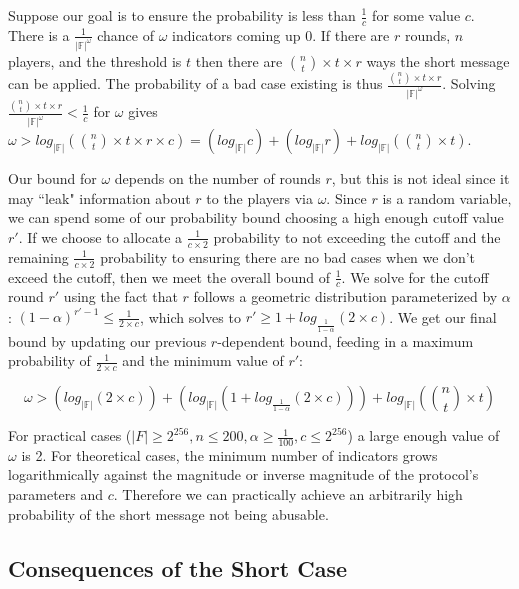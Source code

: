 \documentclass{dalcsthesis}
\begin{document}
Suppose our goal is to ensure the probability is less than $\frac{1}{c}$ for some value $c$. There is a $\frac{1}{|\mathbb{F}|^\omega}$ chance of $\omega$ indicators coming up 0. If there are $r$ rounds, $n$ players, and the threshold is $t$ then there are ${n \choose t} \times t \times r$ ways the short message can be applied. The probability of a bad case existing is thus $\frac{{n \choose t} \times t \times r}{|\mathbb{F}|^\omega}$. Solving $\frac{{n \choose t} \times t \times r}{|\mathbb{F}|^\omega} < \frac{1}{c}$ for $\omega$ gives $\omega > log_{|\mathbb{F}|} ({n \choose t} \times t \times r \times c) = (log_{|\mathbb{F}|} c) + (log_{|\mathbb{F}|} r) + log_{|\mathbb{F}|} ({n \choose t} \times t)$.

Our bound for $\omega$ depends on the number of rounds $r$, but this is not ideal since it may ``leak" information about $r$ to the players via $\omega$. Since $r$ is a random variable, we can spend some of our probability bound choosing a high enough cutoff value $r'$. If we choose to allocate a $\frac{1}{c \times 2}$ probability to not exceeding the cutoff and the remaining $\frac{1}{c \times 2}$ probability to ensuring there are no bad cases when we don't exceed the cutoff, then we meet the overall bound of $\frac{1}{c}$. We solve for the cutoff round $r'$ using the fact that $r$ follows a geometric distribution parameterized by $\alpha$: $(1 - \alpha)^{r'-1} \leq \frac{1}{2 \times c}$, which solves to $r' \geq 1 + log_{\frac{1}{1-\alpha}}(2 \times c)$. We get our final bound by updating our previous $r$-dependent bound, feeding in a maximum probability of $\frac{1}{2 \times c}$ and the minimum value of $r'$:

$$\omega > (log_{|\mathbb{F}|} (2 \times c)) + (log_{|\mathbb{F}|} (1 + log_{\frac{1}{1-\alpha}}(2 \times c))) + log_{|\mathbb{F}|} ({n \choose t} \times t)$$

For practical cases ($|F| \geq 2^{256}, n \leq 200, \alpha \geq \frac{1}{100}, c \leq 2^{256}$) a large enough value of $\omega$ is 2. For theoretical cases, the minimum number of indicators grows logarithmically against the magnitude or inverse magnitude of the protocol's parameters and $c$. Therefore we can practically achieve an arbitrarily high probability of the short message not being abusable.

\subsection{Consequences of the Short Case}
\end{document}
